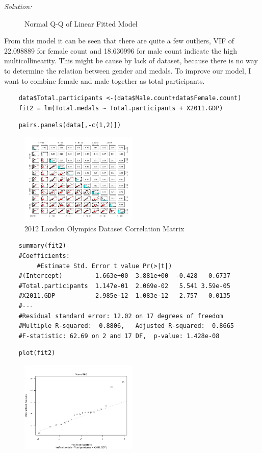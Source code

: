 \documentclass{article}
\newenvironment{solution}
    {\textit{Solution:}}
    {}
\begin{document}
\begin{solution}
\begin{figure}[h]
		\caption{Normal Q-Q of Linear Fitted Model}
	\end{figure}
From this model it can be seen that there are quite a few outliers, VIF of 22.098889 for female count and 18.630996 for male count indicate the high multicollinearity. This might be cause by lack of dataset, because there is no way to determine the relation between gender and medals. 
\newpage
To improve our model, I want to combine female and male together as total participants. 
	\begin{lstlisting}
	data$Total.participants <-(data$Male.count+data$Female.count)
	fit2 = lm(Total.medals ~ Total.participants + X2011.GDP)
	\end{lstlisting}
	\begin{lstlisting}
	pairs.panels(data[,-c(1,2)])
	\end{lstlisting}
	\begin{figure}[h]
		\centering
		\includegraphics[width=0.5\textwidth]{figure5_Rplot.jpeg}
		\caption{2012 London Olympics Dataset Correlation Matrix}
	\end{figure}
	\begin{lstlisting}
	summary(fit2)
	#Coefficients:
         #Estimate Std. Error t value Pr(>|t|)    
	#(Intercept)        -1.663e+00  3.881e+00  -0.428   0.6737    
	#Total.participants  1.147e-01  2.069e-02   5.541 3.59e-05 
	#X2011.GDP           2.985e-12  1.083e-12   2.757   0.0135  
	#---
	#Residual standard error: 12.02 on 17 degrees of freedom
	#Multiple R-squared:  0.8806,	Adjusted R-squared:  0.8665 
	#F-statistic: 62.69 on 2 and 17 DF,  p-value: 1.428e-08
	\end{lstlisting}
\newpage
	\begin{lstlisting}
	plot(fit2)
	\end{lstlisting}
	\begin{figure}[h]
		\centering
		\includegraphics[width=0.5\textwidth]{figure6_Rplot.jpeg}

\end{figure}
\end{solution}
\end{document}
